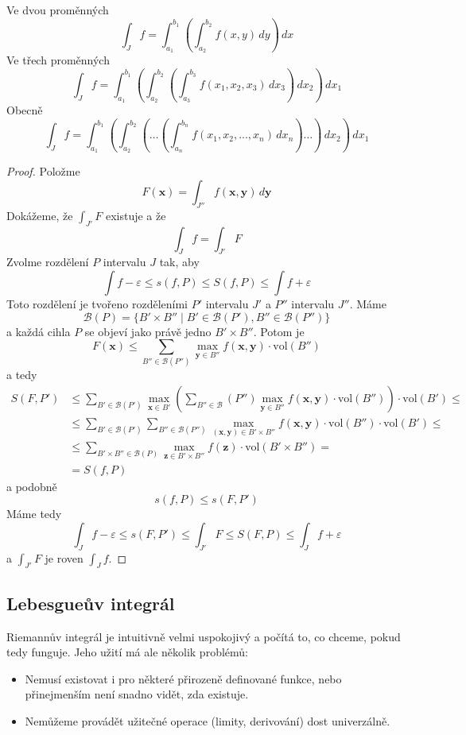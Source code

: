 \documentclass[../main.tex]{subfiles}
\begin{document}
\begin{example}
	Ve dvou proměnných
	\[ \int_{J} f = \int_{a_1}^{b_1} \left( \int_{a_2}^{b_2} f(x,y) \,dy \right) \,dx \]
	Ve třech proměnných
	\[ \int_{J} f =
	\int_{a_1}^{b_1} \left(
	\int_{a_2}^{b_2} \left(
	\int_{a_3}^{b_3} f(x_1, x_2, x_3) \,dx_3 \right) \,dx_2 \right) \,dx_1 \]
	Obecně
	\[ \int_{J} f =
	\int_{a_1}^{b_1} \left(
	\int_{a_2}^{b_2} \left(
	\dots \left(
	\int_{a_n}^{b_n} f(x_1, x_2, ..., x_n) \,dx_n \right) \dots \right) \,dx_2 \right) \,dx_1 \]
\end{example}

\begin{proof}
	Položme
	\[ F(\mathbf{x}) = \int_{J''} f(\mathbf{x}, \mathbf{y}) \,d\mathbf{y} \]
	Dokážeme, že $\int_{J'} F$ existuje a že
	\[ \int_{J} f = \int_{J'} F \]
	Zvolme rozdělení $P$ intervalu $J$ tak, aby
	\[ \int f - \varepsilon \leq s(f,P) \leq S(f,P) \leq \int f + \varepsilon \]
	Toto rozdělení je tvořeno rozděleními $P'$ intervalu $J'$ a $P''$ intervalu $J''$. Máme
	\[ \mathcal{B}(P) = \{ B' \times B'' \mid B' \in \mathcal{B}(P'), B'' \in \mathcal{B}(P'') \} \]
	a každá cihla $P$ se objeví jako právě jedno $B' \times B''$. Potom je
	\[ F(\mathbf{x}) \leq \sum_{B''\in \mathcal{B}(P'')}
	\max_{\mathbf{y} \in B''} f(\mathbf{x}, \mathbf{y}) \cdot \textrm{vol}(B'') \]
	a tedy
	\begin{align*}
	    S(F, P')
	    &\leq \sum_{B' \in \mathcal{B}(P')} \max_{\mathbf{x}\in B'}
	    \left( \sum_{B'' \in \mathcal{B}}(P'') \max_{\mathbf{y}\in B''}
	    f(\mathbf{x}, \mathbf{y}) \cdot \textrm{vol}(B'')\right) \cdot \textrm{vol}(B') \leq\\
	    &\leq \sum_{B' \in \mathcal{B}(P')} \sum_{B'' \in \mathcal{B}(P'')}
	    \max_{(\mathbf{x}, \mathbf{y}) \in B' \times B''} f(\mathbf{x}, \mathbf{y})
	    \cdot \textrm{vol}(B'') \cdot \textrm{vol}(B') \leq\\
	    &\leq \sum_{B' \times B'' \in \mathcal{B}(P)} \max_{\mathbf{z}\in B' \times B''}
	    f(\mathbf{z}) \cdot \textrm{vol}(B' \times B'') =\\
			&= S(f,P)
	\end{align*}
	a podobně
	\[ s(f,P) \leq s(F,P') \]
	Máme tedy
	\[ \int_{J} f - \varepsilon \leq s(F,P') \leq \int_{J'} F \leq S(F,P) \leq \int_{J} f + \varepsilon \]
	a $\int_{J'} F$ je roven $\int_{J} f$.
\end{proof}

\subsection{Lebesgueův integrál}
Riemannův integrál je intuitivně velmi uspokojivý a počítá to, co chceme, pokud tedy funguje.
Jeho užití má ale několik problémů:
\begin{itemize}
    \item Nemusí existovat i pro některé přirozeně definované funkce, nebo
    přinejmenším není snadno vidět, zda existuje.
    \item Nemůžeme provádět užitečné operace (limity, derivování) dost univerzálně.
\end{itemize}
\end{document}
